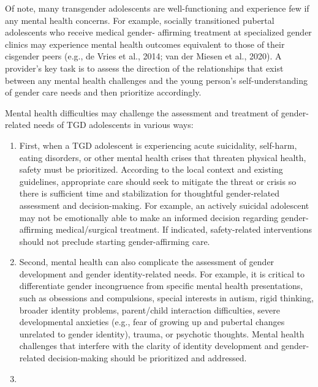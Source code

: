 \documentclass[
]{book}
\providecommand{\tightlist}{%
  \setlength{\itemsep}{0pt}\setlength{\parskip}{0pt}}
\begin{document}
Of note, many transgender adolescents are
well-functioning and experience few if any mental
health concerns. For example, socially transitioned pubertal adolescents who receive medical
gender- affirming treatment at specialized gender
clinics may experience mental health outcomes
equivalent to those of their cisgender peers (e.g.,
de Vries et al., 2014; van der Miesen et al., 2020).
A provider's key task is to assess the direction
of the relationships that exist between any mental
health challenges and the young person's
self-understanding of gender care needs and then
prioritize accordingly.

Mental health difficulties may challenge the
assessment and treatment of gender-related needs
of TGD adolescents in various ways:

\begin{enumerate}
\def\labelenumi{\arabic{enumi}.}
\tightlist
\item
  First, when a TGD adolescent is experiencing acute suicidality, self-harm, eating disorders, or other mental health crises that threaten physical health, safety must be prioritized. According to the local context and existing guidelines, appropriate care should seek to mitigate the threat or crisis so there is sufficient time and stabilization for thoughtful gender-related assessment and decision-making. For example, an actively suicidal adolescent may not be emotionally able to make an informed decision regarding gender-affirming medical/surgical treatment. If indicated, safety-related interventions should not preclude starting gender-affirming care.
\item
  Second, mental health can also complicate the assessment of gender development and gender identity-related needs. For example, it is critical to differentiate gender incongruence from specific mental health presentations, such as obsessions and compulsions, special interests in autism, rigid thinking, broader identity problems, parent/child interaction difficulties, severe
  developmental anxieties (e.g., fear of growing up and pubertal changes unrelated to gender identity), trauma, or psychotic thoughts. Mental health challenges that interfere with the clarity of identity development and gender-related decision-making should be prioritized and addressed.
\item

\end{enumerate}
\end{document}
